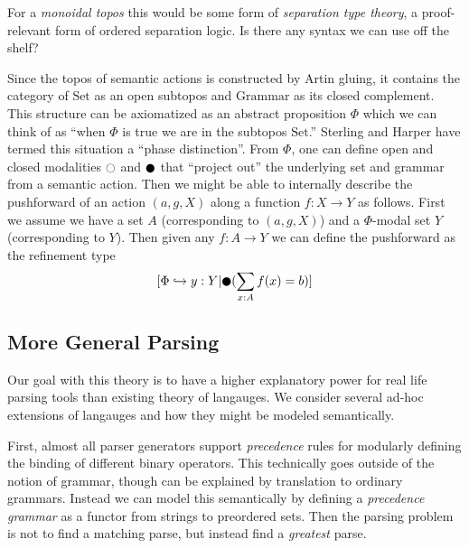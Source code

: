 \documentclass[12pt]{article}
\newcommand{\Set}{\textrm{Set}}
\newcommand{\Grammar}{\textrm{Grammar}}
\begin{document}
For a \emph{monoidal topos} this would be some form of
\emph{separation type theory}, a proof-relevant form of ordered
separation logic. Is there any syntax we can use off the shelf?

Since the topos of semantic actions is constructed by Artin gluing, it
contains the category of $\Set$ as an open subtopos and $\Grammar$ as
its closed complement. This structure can be axiomatized as an
abstract proposition $\Phi$ which we can think of as ``when $\Phi$ is
true we are in the subtopos $\Set$.''  Sterling and Harper have termed
this situation a ``phase distinction''. From $\Phi$, one can define
open and closed modalities $\fullmoon$ and $\newmoon$ that ``project
out'' the underlying set and grammar from a semantic action.
%
Then we might be able to internally describe the pushforward of an
action $(a,g,X)$ along a function $f : X \to Y$ as follows. First we
assume we have a set $A$ (corresponding to $(a,g,X)$) and a
$\Phi$-modal set $Y$ (corresponding to $Y$). Then given any $f : A \to
Y$ we can define the pushforward as the refinement type
\[ [ \Phi \hookrightarrow y : Y | \newmoon (\sum_{x:A} f(x) = b) ]\]

\subsection{More General Parsing}

Our goal with this theory is to have a higher explanatory power for
real life parsing tools than existing theory of langauges. We consider
several ad-hoc extensions of langauges and how they might be modeled
semantically.

First, almost all parser generators support \emph{precedence} rules
for modularly defining the binding of different binary operators.
This technically goes outside of the notion of grammar, though can be
explained by translation to ordinary grammars.
%
Instead we can model this semantically by defining a \emph{precedence
grammar} as a functor from strings to preordered sets. Then the
parsing problem is not to find a matching parse, but instead find a
\emph{greatest} parse.
\end{document}

